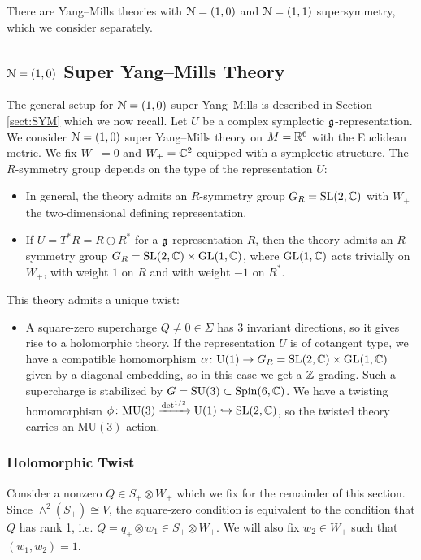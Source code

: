 \documentclass[10pt, oneside]{article}
\newcommand{\MU}{\mathrm{MU}}
\renewcommand{\U}{\mathrm{U}}
\begin{document}
There are Yang--Mills theories with $\mathcal N=(1, 0)$ and $\mathcal N=(1, 1)$ supersymmetry, which we consider separately.

\subsection{\texorpdfstring{$\mathcal N=(1, 0)$}{N=(1, 0)} Super Yang--Mills Theory}

The general setup for $\mathcal N=(1, 0)$ super Yang--Mills is described in Section \ref{sect:SYM} which we now recall. Let $U$ be a complex symplectic $\mathfrak g$-representation. We consider $\mathcal N=(1, 0)$ super Yang--Mills theory on $M=\mathbb R^6$ with the Euclidean metric. We fix $W_- = 0$ and $W_+=\mathbb C^2$ equipped with a symplectic structure. The $R$-symmetry group depends on the type of the representation $U$:
\begin{itemize}
\item In general, the theory admits an $R$-symmetry group $G_R=\mathrm{SL}(2, \mathbb C)$ with $W_+$ the two-dimensional defining representation.

\item If $U = T^* R=R\oplus R^*$ for a $\mathfrak g$-representation $R$, then the theory admits an $R$-symmetry group $G_R=\mathrm{SL}(2, \mathbb C)\times \mathrm{GL}(1, \mathbb C)$, where $\mathrm{GL}(1, \mathbb C)$ acts trivially on $W_+$, with weight $1$ on $R$ and with weight $-1$ on $R^*$.
\end{itemize}

This theory admits a unique twist:
\begin{itemize}
\item A square-zero supercharge $Q\neq 0\in\Sigma$ has 3 invariant directions, so it gives rise to a holomorphic theory. If the representation $U$ is of cotangent type, we have a compatible homomorphism $\alpha\colon \U(1)\rightarrow G_R=\SL(2, \CC)\times \GL(1, \CC)$ given by a diagonal embedding, so in this case we get a $\mathbb Z$-grading. Such a supercharge is stabilized by $G=\mathrm{SU}(3)\subset \mathrm{Spin}(6, \mathbb C)$. We have a twisting homomorphism $\phi\colon\MU(3)\xrightarrow{\det^{1/2}}\U(1)\hookrightarrow \SL(2, \CC)$, so the twisted theory carries an $\MU(3)$-action.
\end{itemize}

\subsubsection{Holomorphic Twist}
\label{sect:6dholomorphictwist}

Consider a nonzero $Q\in S_+\otimes W_+$ which we fix for the remainder of this section. Since $\wedge^2(S_+)\cong V$, the square-zero condition is equivalent to the condition that $Q$ has rank 1, i.e. $Q=q_+\otimes w_1\in S_+\otimes W_+$. We will also fix $w_2\in W_+$ such that $(w_1, w_2) = 1$.
\end{document}
